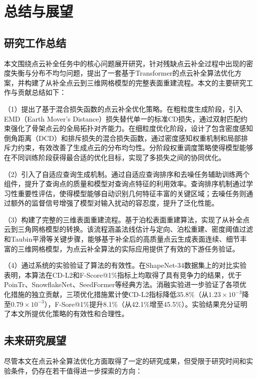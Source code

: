 \chapter{总结与展望}
\label{cha:summary}

\section{研究工作总结}

本文围绕点云补全任务中的核心问题展开研究，针对残缺点云补全过程中出现的密度失衡与分布不均匀问题，提出了一套基于Transformer的点云补全算法优化方案，并构建了从补全点云到三维网格模型的完整表面重建流程。本文的主要研究工作与贡献总结如下：

（1）提出了基于混合损失函数的点云补全优化策略。在粗粒度生成阶段，引入EMD（Earth Mover's Distance）损失替代单一的标准CD损失，通过双射匹配约束强化了骨架点云的全局拓扑对齐能力。在细粒度优化阶段，设计了包含密度感知倒角距离（DCD）和排斥损失的混合损失函数，通过密度感知权重机制和局部排斥力约束，有效改善了生成点云的分布均匀性。分阶段权重调度策略使得模型能够在不同训练阶段获得最合适的优化目标，实现了多损失之间的协同优化。

（2）引入了自适应查询生成机制。通过自适应查询排序和去噪任务辅助训练两个组件，提升了查询点的质量和模型对查询点特征的利用效率。查询排序机制通过学习性重要性评估，使得模型能够自动识别几何特征丰富的关键区域；去噪任务则通过额外的监督信号增强了模型对输入扰动的容忍度，提升了泛化性能。

（3）构建了完整的三维表面重建流程。基于泊松表面重建算法，实现了从补全点云到三角网格模型的转换。该流程涵盖法线估计与定向、泊松重建、密度阈值过滤和Taubin平滑等关键步骤，能够基于补全后的高质量点云生成表面连续、细节丰富的三维网格模型，为点云补全算法的实际应用提供了有效的下游任务验证。

（4）通过系统的实验验证了算法的有效性。在ShapeNet-34数据集上的对比实验表明，本算法在CD-L2和F-Score@1\%指标上均取得了具有竞争力的结果，优于PoinTr、SnowflakeNet、SeedFormer等经典方法。消融实验进一步验证了各项优化措施的独立贡献，三项优化措施累计使CD-L2指标降低35.8\%（从$1.23 \times 10^{-3}$降至$0.79 \times 10^{-3}$），F-Sore@1\%提升8.1\%（从42.1\%增至45.5\%）。实验结果充分证明了本文所提优化策略的有效性和合理性。

\section{未来研究展望}

尽管本文在点云补全算法优化方面取得了一定的研究成果，但受限于研究时间和实验条件，仍存在若干值得进一步探索的方向：

